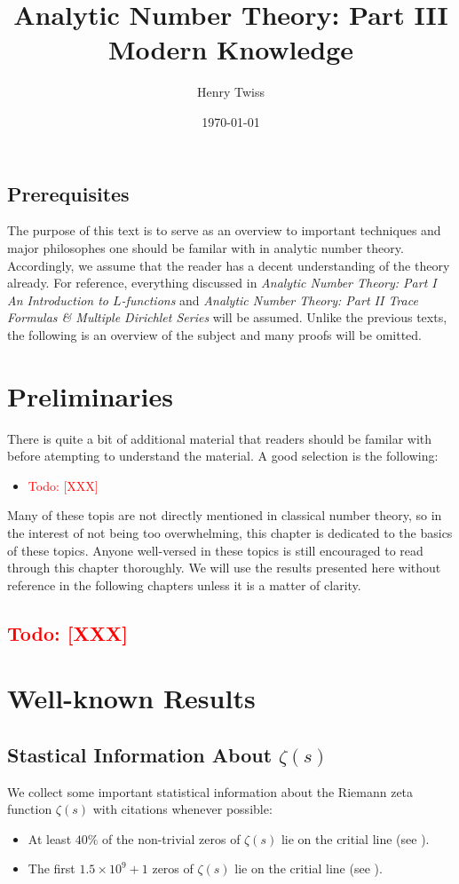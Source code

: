 \documentclass[12pt]{book}
\title{Analytic Number Theory: Part III \\ Modern Knowledge}
\author{Henry Twiss}
\date{\today}
\theoremstyle{definition}\newframedtheorem{method}{Method}
\newcommand{\z}{\zeta}
\newcommand{\x}{\times}
\newcommand{\<}{\langle}
\renewcommand{\>}{\rangle}
\newcommand{\todo}[1]{\textcolor{red}{\sf Todo: [#1]}}
\begin{document}
\maketitle
\thispagestyle{fancy}

\newpage

\section*{Prerequisites}
  The purpose of this text is to serve as an overview to important techniques and major philosophes one should be familar with in analytic number theory. Accordingly, we assume that the reader has a decent understanding of the theory already. For reference, everything discussed in \textit{Analytic Number Theory: Part I An Introduction to $L$-functions} and \textit{Analytic Number Theory: Part II Trace Formulas \& Multiple Dirichlet Series} will be assumed. Unlike the previous texts, the following is an overview of the subject and many proofs will be omitted.

\newpage

\tableofcontents

\newpage

\chapter{Preliminaries}
  There is quite a bit of additional material that readers should be familar with before atempting to understand the material. A good selection is the following:
  \begin{itemize}
    \item \todo{XXX}
  \end{itemize}
  Many of these topis are not directly mentioned in classical number theory, so in the interest of not being too overwhelming, this chapter is dedicated to the basics of these topics. Anyone well-versed in these topics is still encouraged to read through this chapter thoroughly. We will use the results presented here without reference in the following chapters unless it is a matter of clarity.
  \section{\todo{XXX}}
\chapter{Well-known Results}
  \section{Stastical Information About \texorpdfstring{$\z(s)$}{z(s)}}
    We collect some important statistical information about the Riemann zeta function $\z(s)$ with citations whenever possible:
    \begin{itemize}
      \item At least $40\%$ of the non-trivial zeros of $\z(s)$ lie on the critial line (see \cite{conrey1989more}).
      \item The first $1.5 \x 10^{9}+1$ zeros of $\z(s)$ lie on the critial line (see \cite{van1986zeros}).
    \end{itemize}
\end{document}
